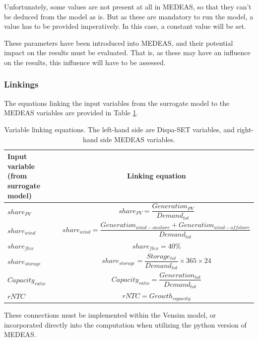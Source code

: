 Unfortunately, some values are not present at all in MEDEAS, so that they can't be deduced from the model as is. But as these are mandatory to run the model, a value has to be provided imperatively. In this case, a constant value will be set.

These parameters have been introduced into MEDEAS, and their potential impact on the results must be evaluated. That is, as these may have an influence on the results, this influence will have to be assessed.

\subsubsection{Linkings}

The equations linking the input variables from the surrogate model to the MEDEAS variables are provided in Table \ref{tab:linking-equations}.

\begin{table}[h]
    \centering
    \begin{tabular}{|m{3.6cm}|c|}
    \hline 
    Input variable (from surrogate model) & Linking equation \\ \hline
    $share_{PV}$ & $share_{PV}=\dfrac{Generation_{PV}}{Demand_{tot}}$ \\ \hline 
    $share_{wind}$ & $share_{wind}=\dfrac{Generation_{wind-onshore} + Generation_{wind-offshore}}{Demand_{tot}}$ \\ \hline 
    $share_{flex}$ & $share_{flex}=40\%$ \\ \hline 
    $share_{storage}$ & $share_{storage}=\dfrac{Storage_{tot}}{Demand_{tot}}\times 365\times 24$ \\ \hline 
    $Capacity_{ratio}$ & $Capacity_{ratio}=\dfrac{Generation_{tot}}{Demand_{tot}}$ \\ \hline 
    $rNTC$ & $rNTC= Growth_{capacity}$ \\ \hline 
    \end{tabular}
    \caption{Variable linking equations. The left-hand side are Dispa-SET variables, and right-hand side MEDEAS variables.}
    \label{tab:linking-equations}
\end{table}

These connections must be implemented within the Vensim model, or incorporated directly into the computation when utilizing the python version of MEDEAS.